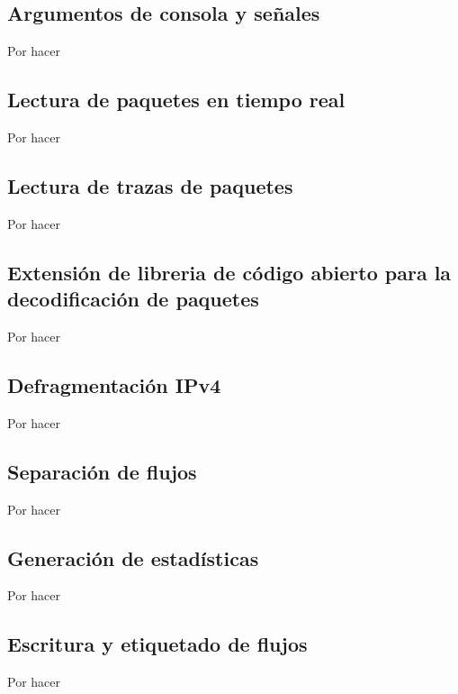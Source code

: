 \subsection{Argumentos de consola y señales}

Por hacer

\subsection{Lectura de paquetes en tiempo real}

Por hacer

\subsection{Lectura de trazas de paquetes}

Por hacer

\subsection{Extensión de libreria de código abierto para la decodificación de paquetes}

Por hacer

\subsection{Defragmentación IPv4}

Por hacer

\subsection{Separación de flujos}

Por hacer

\subsection{Generación de estadísticas}

Por hacer

\subsection{Escritura y etiquetado de flujos}

Por hacer

